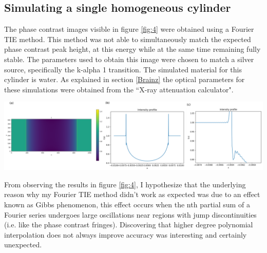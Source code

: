 \documentclass[10pt, a4paper, singlespacing]{report}
\newenvironment{Figure}
    {\par\medskip\noindent\minipage{\linewidth}}
    {\endminipage\par\medskip}
\begin{document}
\subsection{Simulating a single homogeneous cylinder}\label{Single cylinder}
The phase contrast images visible in figure \ref{fig:4} were obtained using a Fourier TIE method. This method was not able to simultaneously match the expected phase contrast peak height, at this energy while at the same time remaining fully stable. The parameters used to obtain this image were chosen to match a silver source, specifically the k-alpha 1 transition. The simulated material for this cylinder is water. As explained in section \ref{Brainz} the optical parameters for these simulations were obtained from the ``X-ray attenuation calculator".
\begin{Figure}\label{fig:4}
\centering
\includegraphics[width=\linewidth]{Fourier_intensity_profile.pdf}
\end{Figure}
From observing the results in figure \ref{fig:4}, I hypothesize that the underlying reason why my Fourier TIE method didn't work as expected was due to an effect known as Gibbs phenomenon, this effect occurs when the nth partial sum of a Fourier series undergoes large oscillations near regions with jump discontinuities\cite{Gibbs} (i.e. like the phase contrast fringes). Discovering that higher degree polynomial interpolation does not always improve accuracy was interesting and certainly unexpected.
\end{document}
